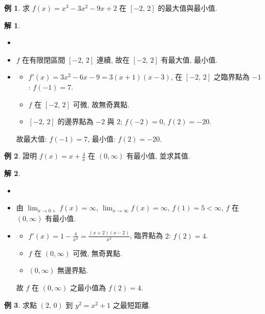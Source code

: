 \documentclass[12pt]{extarticle}
\newcommand{\ds}{\displaystyle}
\theoremstyle{definition}
\newtheorem*{ex}{例}
\newtheorem*{sol}{解}
\begin{document}
\begin{ex}
  求 $f(x) = x^3 - 3 x^2 - 9x + 2$ 在 $[-2,\,2]$ 的最大值與最小值. 
\end{ex}

\begin{sol}
  \begin{itemize}\setlength\itemsep{0em}
    \item[]
    \item $f$ 在有限閉區間 $[-2,\,2]$ 連續, 故在 $[-2,\,2]$ 有最大值, 最小值. 
    \item 
      \begin{itemize}\setlength\itemsep{0em}
        \item $\ds f'(x) = 3 x^2 - 6 x - 9 = 3(x + 1)(x - 3)$, 在 $[-2,\,2]$ 之臨界點為 $-1$: $f(-1) = 7$. 
        \item $f$ 在 $[-2,\,2]$ 可微, 故無奇異點. 
        \item $[-2,\,2]$ 的邊界點為 $-2$ 與 $2$; $f(-2) = 0$, $f(2) = -20$. 
      \end{itemize}
      故最大值: $f(-1) = 7$, 最小值: $f(2) = -20$. 
  \end{itemize}
\end{sol}

\begin{ex}
  證明 $\ds f(x) = x + \frac{4}{x}$ 在 $\ds (0, \infty)$ 有最小值, 並求其值. 
\end{ex}

\begin{sol}
  \begin{itemize}\setlength\itemsep{0em}
    \item[]
    \item 由 $\ds\lim_{x\to 0+}f(x) = \infty$, $\ds\lim_{x\to\infty}f(x) = \infty$, $f(1) = 5 < \infty$, $f$ 在 $(0, \infty)$ 有最小值. 
    \item 
      \begin{itemize}\setlength\itemsep{0em}
        \item $\ds f'(x) = 1 - \frac{4}{x^2} = \frac{(x + 2)(x - 2)}{x^2}$, 臨界點為 $2$: $f(2) = 4$. 
        \item $f$ 在 $(0, \infty)$ 可微, 無奇異點. 
        \item $(0, \infty)$ 無邊界點. 
      \end{itemize}
      故 $f$ 在 $(0, \infty)$ 之最小值為 $f(2) = 4$. 
  \end{itemize}
\end{sol}

\begin{ex}
  求點 $(2,\,0)$ 到 $y^2 = x^2 + 1$ 之最短距離. 
\end{ex}
\end{document}
